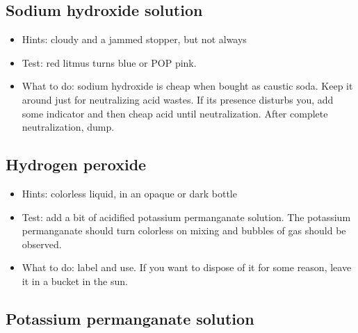 \subsection{Sodium hydroxide solution}

\begin{itemize}

\item{Hints: cloudy and a jammed stopper, 
but not always}

\item{Test: red litmus turns blue or POP pink.}

\item{What to do: sodium hydroxide is cheap when bought as caustic soda. 
Keep it around just for neutralizing acid wastes. 
If its presence disturbs you, 
add some indicator and then cheap acid until neutralization. 
After complete neutralization, 
dump.}

\end{itemize}

\subsection{Hydrogen peroxide}

\begin{itemize}

\item{Hints: colorless liquid, 
in an opaque or dark bottle}

\item{Test: add a bit of acidified potassium permanganate solution. 
The potassium permanganate should turn colorless 
on mixing and bubbles of gas should be observed.}

\item{What to do: label and use. 
If you want to dispose of it for some reason, 
leave it in a bucket in the sun.}

\end{itemize}

\subsection{Potassium permanganate solution}

